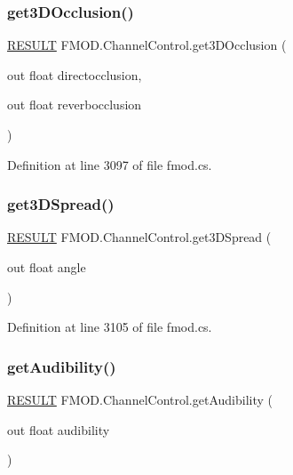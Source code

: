 \subsubsection{\texorpdfstring{get3\+D\+Occlusion()}{get3DOcclusion()}}
{\footnotesize\ttfamily \hyperlink{namespace_f_m_o_d_a305d1176ef3f8c8815861a60407ac33d}{R\+E\+S\+U\+LT} F\+M\+O\+D.\+Channel\+Control.\+get3\+D\+Occlusion (\begin{DoxyParamCaption}\item[{out float}]{directocclusion,  }\item[{out float}]{reverbocclusion }\end{DoxyParamCaption})}



Definition at line 3097 of file fmod.\+cs.

\mbox{\label{class_f_m_o_d_1_1_channel_control_af8a352157fe729017d4162e8c19b81b0}} 
\subsubsection{\texorpdfstring{get3\+D\+Spread()}{get3DSpread()}}
{\footnotesize\ttfamily \hyperlink{namespace_f_m_o_d_a305d1176ef3f8c8815861a60407ac33d}{R\+E\+S\+U\+LT} F\+M\+O\+D.\+Channel\+Control.\+get3\+D\+Spread (\begin{DoxyParamCaption}\item[{out float}]{angle }\end{DoxyParamCaption})}



Definition at line 3105 of file fmod.\+cs.

\mbox{\label{class_f_m_o_d_1_1_channel_control_afb1ce1ec5d0ca2d6d2c685662571fafd}} 
\subsubsection{\texorpdfstring{get\+Audibility()}{getAudibility()}}
{\footnotesize\ttfamily \hyperlink{namespace_f_m_o_d_a305d1176ef3f8c8815861a60407ac33d}{R\+E\+S\+U\+LT} F\+M\+O\+D.\+Channel\+Control.\+get\+Audibility (\begin{DoxyParamCaption}\item[{out float}]{audibility }\end{DoxyParamCaption})}



